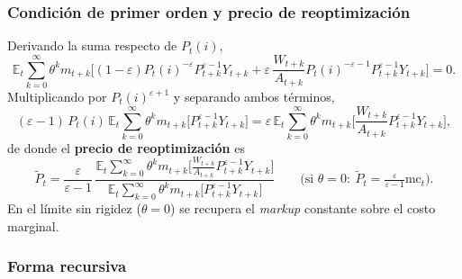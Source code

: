 \documentclass[11pt]{article}
\theoremstyle{definition}
\newcommand{\E}{\mathbb{E}}
\newcommand{\mc}{\mathrm{mc}}
\begin{document}
\subsubsection{Condición de primer orden y precio de reoptimización}

Derivando la suma respecto de $P_{t}(i)$,
\begin{equation}
\E_{t}\sum_{k=0}^{\infty}\theta^{k}m_{t+k}\Big[(1-\varepsilon)P_{t}(i)^{-\varepsilon}P_{t+k}^{\varepsilon-1}Y_{t+k}
+\varepsilon\,\frac{W_{t+k}}{A_{t+k}}P_{t}(i)^{-\varepsilon-1}P_{t+k}^{\varepsilon-1}Y_{t+k}\Big]=0 .
\end{equation}
Multiplicando por $P_{t}(i)^{\varepsilon+1}$ y separando ambos términos,
\begin{equation}
(\varepsilon-1)\,P_{t}(i)\,\E_{t}\sum_{k=0}^{\infty}\theta^{k}m_{t+k}\big[P_{t+k}^{\varepsilon-1}Y_{t+k}\big]
=\varepsilon\,\E_{t}\sum_{k=0}^{\infty}\theta^{k}m_{t+k}\Big[\frac{W_{t+k}}{A_{t+k}}P_{t+k}^{\varepsilon-1}Y_{t+k}\Big],
\end{equation}
de donde el \textbf{precio de reoptimización} es
\begin{equation}
\widetilde{P}_{t}=\frac{\varepsilon}{\varepsilon-1}\,
\frac{\E_{t}\sum_{k=0}^{\infty}\theta^{k}m_{t+k}\big[\tfrac{W_{t+k}}{A_{t+k}}P_{t+k}^{\varepsilon-1}Y_{t+k}\big]}
{\E_{t}\sum_{k=0}^{\infty}\theta^{k}m_{t+k}\big[P_{t+k}^{\varepsilon-1}Y_{t+k}\big]}
\qquad\Big(\text{si }\theta=0:\ \widetilde{P}_{t}=\tfrac{\varepsilon}{\varepsilon-1}\mc_{t}\Big).
\end{equation}
En el límite sin rigidez ($\theta=0$) se recupera el \emph{markup} constante sobre el costo marginal.

\subsubsection{Forma recursiva}
\end{document}
